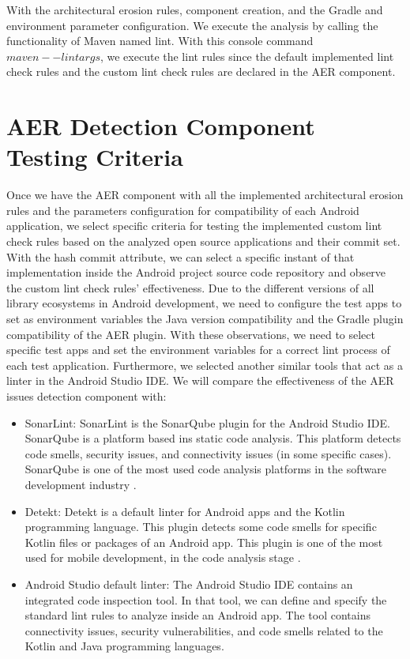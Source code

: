 With the architectural erosion rules, component creation, and the Gradle and environment parameter configuration. We execute the analysis by calling the functionality of Maven named lint. With this console command $maven --lint args$, we execute the lint rules since the default implemented lint check rules and the custom lint check rules are declared in the AER component.

\section{AER Detection Component Testing Criteria}
Once we have the AER component with all the implemented architectural erosion rules and the parameters configuration for compatibility of each Android application, we select specific criteria for testing the implemented custom lint check rules based on the analyzed open source applications and their commit set. With the hash commit attribute, we can select a specific instant of that implementation inside the Android project source code repository and observe the custom lint check rules' effectiveness. Due to the different versions of all library ecosystems in Android development, we need to configure the test apps to set as environment variables the Java version compatibility and the Gradle plugin compatibility of the AER plugin. With these observations, we need to select specific test apps and set the environment variables for a correct lint process of each test application.
Furthermore, we selected another similar tools that act as a linter in the Android Studio IDE. We will compare the effectiveness of the AER issues detection component with:

\begin{itemize}
	\item SonarLint: SonarLint is the SonarQube plugin for the Android Studio IDE. SonarQube is a platform based ins static code analysis. This platform detects code smells, security issues, and connectivity issues (in some specific cases). SonarQube is one of the most used code analysis platforms in the software development industry \cite{sonarlint}.
	\item Detekt: Detekt is a default linter for Android apps and the Kotlin programming language. This plugin detects some code smells for specific Kotlin files or packages of an Android app. This plugin is one of the most used for mobile development, in the code analysis stage \cite{detekt}.
	\item Android Studio default linter: The Android Studio IDE contains an integrated code inspection tool. In that tool, we can define and specify the standard lint rules to analyze inside an Android app. The tool contains connectivity issues, security vulnerabilities, and code smells related to the Kotlin and Java programming languages.
\end{itemize}

